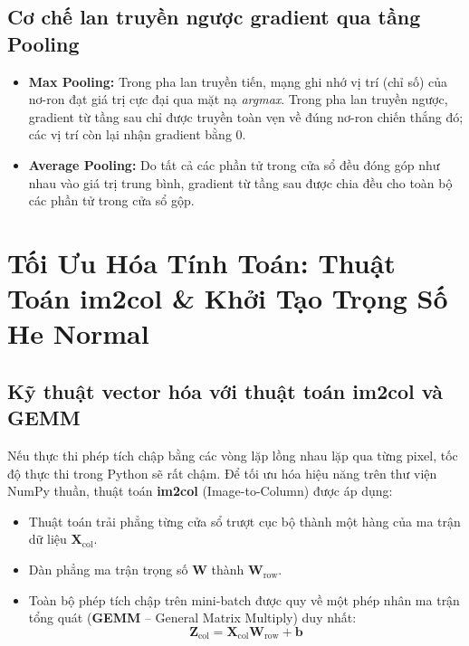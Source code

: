 \documentclass[12pt,a4paper]{report}
\begin{document}
\subsection{Cơ chế lan truyền ngược gradient qua tầng Pooling}
\begin{itemize}
    \item \textbf{Max Pooling:} Trong pha lan truyền tiến, mạng ghi nhớ vị trí (chỉ số) của nơ-ron đạt giá trị cực đại qua mặt nạ \textit{argmax}. Trong pha lan truyền ngược, gradient từ tầng sau chỉ được truyền toàn vẹn về đúng nơ-ron chiến thắng đó; các vị trí còn lại nhận gradient bằng 0.
    \item \textbf{Average Pooling:} Do tất cả các phần tử trong cửa sổ đều đóng góp như nhau vào giá trị trung bình, gradient từ tầng sau được chia đều cho toàn bộ các phần tử trong cửa sổ gộp.
\end{itemize}

\section{Tối Ưu Hóa Tính Toán: Thuật Toán im2col \& Khởi Tạo Trọng Số He Normal}
\subsection{Kỹ thuật vector hóa với thuật toán im2col và GEMM}
Nếu thực thi phép tích chập bằng các vòng lặp lồng nhau lặp qua từng pixel, tốc độ thực thi trong Python sẽ rất chậm. Để tối ưu hóa hiệu năng trên thư viện NumPy thuần, thuật toán \textbf{im2col} (Image-to-Column) được áp dụng:
\begin{itemize}
    \item Thuật toán trải phẳng từng cửa sổ trượt cục bộ thành một hàng của ma trận dữ liệu $\mathbf{X}_{\text{col}}$.
    \item Dàn phẳng ma trận trọng số $\mathbf{W}$ thành $\mathbf{W}_{\text{row}}$.
    \item Toàn bộ phép tích chập trên mini-batch được quy về một phép nhân ma trận tổng quát (\textbf{GEMM} -- General Matrix Multiply) duy nhất:
    \begin{equation}
        \mathbf{Z}_{\text{col}} = \mathbf{X}_{\text{col}} \mathbf{W}_{\text{row}} + \mathbf{b}
    \end{equation}
\end{itemize}
\end{document}
